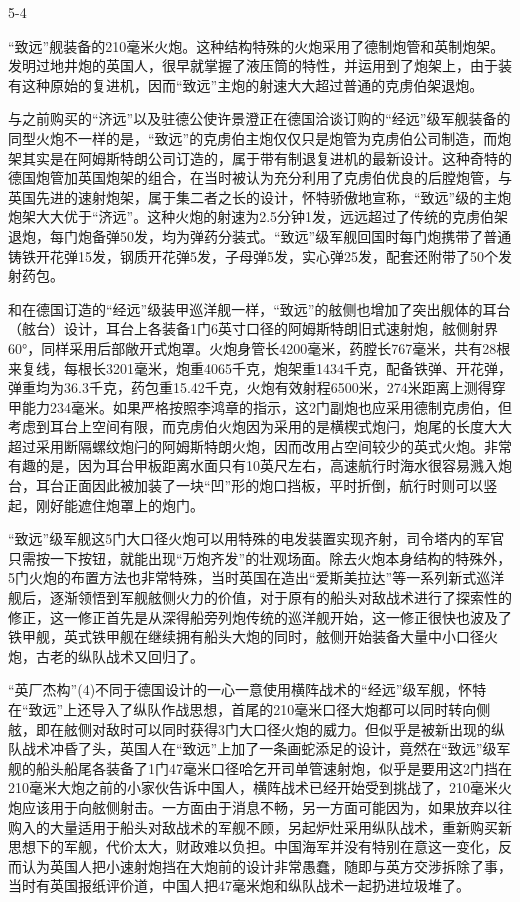 \documentclass[12pt,UTF8]{ctexbook}
\begin{document}
5-4

“致远”舰装备的210毫米火炮。这种结构特殊的火炮采用了德制炮管和英制炮架。发明过地井炮的英国人，很早就掌握了液压筒的特性，并运用到了炮架上，由于装有这种原始的复进机，因而“致远”主炮的射速大大超过普通的克虏伯架退炮。

与之前购买的“济远”以及驻德公使许景澄正在德国洽谈订购的“经远”级军舰装备的同型火炮不一样的是，“致远”的克虏伯主炮仅仅只是炮管为克虏伯公司制造，而炮架其实是在阿姆斯特朗公司订造的，属于带有制退复进机的最新设计。这种奇特的德国炮管加英国炮架的组合，在当时被认为充分利用了克虏伯优良的后膛炮管，与英国先进的速射炮架，属于集二者之长的设计，怀特骄傲地宣称，“致远”级的主炮炮架大大优于“济远”。这种火炮的射速为2.5分钟1发，远远超过了传统的克虏伯架退炮，每门炮备弹50发，均为弹药分装式。“致远”级军舰回国时每门炮携带了普通铸铁开花弹15发，钢质开花弹5发，子母弹5发，实心弹25发，配套还附带了50个发射药包。

和在德国订造的“经远”级装甲巡洋舰一样，“致远”的舷侧也增加了突出舰体的耳台（舷台）设计，耳台上各装备1门6英寸口径的阿姆斯特朗旧式速射炮，舷侧射界60°，同样采用后部敞开式炮罩。火炮身管长4200毫米，药膛长767毫米，共有28根来复线，每根长3201毫米，炮重4065千克，炮架重1434千克，配备铁弹、开花弹，弹重均为36.3千克，药包重15.42千克，火炮有效射程6500米，274米距离上测得穿甲能力234毫米。如果严格按照李鸿章的指示，这2门副炮也应采用德制克虏伯，但考虑到耳台上空间有限，而克虏伯火炮因为采用的是横楔式炮闩，炮尾的长度大大超过采用断隔螺纹炮闩的阿姆斯特朗火炮，因而改用占空间较少的英式火炮。非常有趣的是，因为耳台甲板距离水面只有10英尺左右，高速航行时海水很容易溅入炮台，耳台正面因此被加装了一块“凹”形的炮口挡板，平时折倒，航行时则可以竖起，刚好能遮住炮罩上的炮门。

“致远”级军舰这5门大口径火炮可以用特殊的电发装置实现齐射，司令塔内的军官只需按一下按钮，就能出现“万炮齐发”的壮观场面。除去火炮本身结构的特殊外，5门火炮的布置方法也非常特殊，当时英国在造出“爱斯美拉达”等一系列新式巡洋舰后，逐渐领悟到军舰舷侧火力的价值，对于原有的船头对敌战术进行了探索性的修正，这一修正首先是从深得船旁列炮传统的巡洋舰开始，这一修正很快也波及了铁甲舰，英式铁甲舰在继续拥有船头大炮的同时，舷侧开始装备大量中小口径火炮，古老的纵队战术又回归了。

“英厂杰构”(4)不同于德国设计的一心一意使用横阵战术的“经远”级军舰，怀特在“致远”上还导入了纵队作战思想，首尾的210毫米口径大炮都可以同时转向侧舷，即在舷侧对敌时可以同时获得3门大口径火炮的威力。但似乎是被新出现的纵队战术冲昏了头，英国人在“致远”上加了一条画蛇添足的设计，竟然在“致远”级军舰的船头船尾各装备了1门47毫米口径哈乞开司单管速射炮，似乎是要用这2门挡在210毫米大炮之前的小家伙告诉中国人，横阵战术已经开始受到挑战了，210毫米火炮应该用于向舷侧射击。一方面由于消息不畅，另一方面可能因为，如果放弃以往购入的大量适用于船头对敌战术的军舰不顾，另起炉灶采用纵队战术，重新购买新思想下的军舰，代价太大，财政难以负担。中国海军并没有特别在意这一变化，反而认为英国人把小速射炮挡在大炮前的设计非常愚蠢，随即与英方交涉拆除了事，当时有英国报纸评价道，中国人把47毫米炮和纵队战术一起扔进垃圾堆了。
\end{document}
